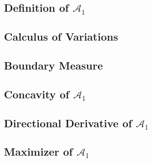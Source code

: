 
\subsection{Definition of $\mathcal{A}_1$}
\label{sec:definition-of-a1}


\subsection{Calculus of Variations}
\label{sec:calculus-of-variation}


\subsection{Boundary Measure}
\label{sec:boundary-measure}


\subsection{Concavity of $\mathcal{A}_1$}
\label{sec:concavity-of-a1}


\subsection{Directional Derivative of $\mathcal{A}_1$}
\label{sec:directional-derivative-of-a1}


\subsection{Maximizer of $\mathcal{A}_1$}
\label{sec:maximizer-of-a1}


